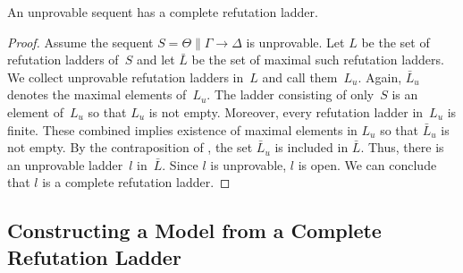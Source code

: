    \begin{proposition}
    \label{comprefl}
    An unprovable sequent has a complete refutation ladder.
   \end{proposition}
   \begin{proof}
    Assume the sequent
    $S = \Theta\parallel \Gamma\longrightarrow\Delta$
    is unprovable.
    Let $L$ be the set of refutation ladders of~$S$ and
    let $\bar L$ be the set of maximal such refutation ladders.
    We collect unprovable refutation ladders in~$L$ and call them~$L_u$.
    Again, $\bar L_u$ denotes the maximal elements of~$L_u$.
    The ladder consisting of only~$S$ is an element of~$L_u$
    so that $L_u$ is not empty.
    Moreover, every refutation ladder in~$L_u$ is finite.
    These combined implies existence of maximal elements in $L_u$ so that $\bar L_u$ is not empty.
    By the contraposition of , the set $\bar L_u$ is included in $\bar L$.
    Thus, there is an unprovable ladder~$l$ in~$\bar L$.
    Since $l$ is unprovable, $l$ is open.
    We can conclude that $l$ is a complete refutation ladder.
   \end{proof}


   \subsection{Constructing a Model from a Complete Refutation Ladder}

